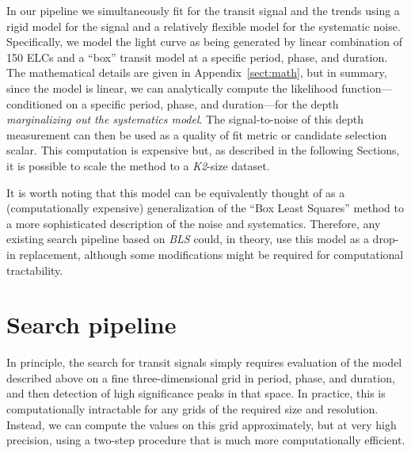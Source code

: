 \documentclass[12pt,preprint]{aastex}
\newcommand{\project}[1]{\textsl{#1}} %
\newcommand{\KT}{\project{K2}}
\newcommand{\sectionname}{Section}
\newcommand{\App}[1]{Appendix~\ref{sect:#1}}
\newcommand{\app}[1]{\App{#1}}
\newcommand{\sectlabel}[1]{\label{sect:#1}}
\begin{document}
In our pipeline we simultaneously fit for the transit
signal and the trends using a rigid model for the signal and a relatively
flexible model for the systematic noise.
Specifically, we model the light curve as being generated by linear
combination of 150 ELCs and a ``box'' transit model at a specific period,
phase, and duration.
The mathematical details are given in \app{math}, but in summary, since the
model is linear, we can analytically compute the likelihood
function---conditioned on a specific period, phase, and duration---for the
depth \emph{marginalizing out the systematics model}.
The signal-to-noise of this depth measurement can then be used as a quality
of fit metric or candidate selection scalar.
This computation is expensive but, as described in the following \sectionname s, it
is possible to scale the method to a \KT-size dataset.

It is worth noting that this model can be equivalently thought of as a
(computationally expensive) generalization of the ``Box Least Squares''
\citep[\project{BLS};][]{bls} method to a more sophisticated description of
the noise and systematics.
Therefore, any existing search pipeline based on \project{BLS} could, in
theory, use this model as a drop-in replacement, although some modifications
might be required for computational tractability.


\section{Search pipeline}
\sectlabel{search}

In principle, the search for transit signals simply requires evaluation of the
model described above on a fine three-dimensional grid in period, phase, and
duration, and then detection of high significance peaks in that space.
In practice, this is computationally intractable for any grids of the
required size and resolution.
Instead, we can compute the values on this grid approximately, but at very
high precision, using a two-step procedure that is much more computationally
efficient.
\end{document}
